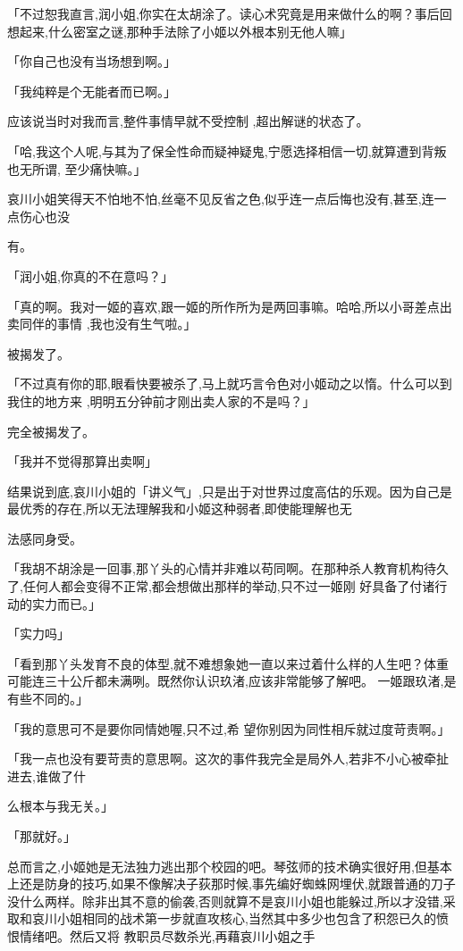 \documentclass{article}
\begin{document}
「不过恕我直言,润小姐,你实在太胡涂了。读心术究竟是用来做什么的啊？事后回想起来,什么密室之谜,那种手法除了小姬以外根本别无他人嘛」


「你自己也没有当场想到啊。」 


「我纯粹是个无能者而已啊。」 

应该说当时对我而言,整件事情早就不受控制
,超出解谜的状态了。 

「哈,我这个人呢,与其为了保全性命而疑神疑鬼,宁愿选择相信一切,就算遭到背叛也无所谓,
至少痛快嘛。」 

哀川小姐笑得天不怕地不怕,丝毫不见反省之色,似乎连一点后悔也没有,甚至,连一点伤心也没
\newpage

有。 


「润小姐,你真的不在意吗？」 

「真的啊。我对一姬的喜欢,跟一姬的所作所为是两回事嘛。哈哈,所以小哥差点出卖同伴的事情
,我也没有生气啦。」 


被揭发了。 

「不过真有你的耶,眼看快要被杀了,马上就巧言令色对小姬动之以惰。什么可以到我住的地方来
,明明五分钟前才刚出卖人家的不是吗？」 


完全被揭发了。 


「我并不觉得那算出卖啊」 

结果说到底,哀川小姐的「讲义气」,只是出于对世界过度高估的乐观。因为自己是最优秀的存在,所以无法理解我和小姬这种弱者,即使能理解也无
\newpage

法感同身受。 

「我胡不胡涂是一回事,那丫头的心情并非难以苟同啊。在那种杀人教育机构待久了,任何人都会变得不正常,都会想做出那样的举动,只不过一姬刚
好具备了付诸行动的实力而已。」 


「实力吗」 

「看到那丫头发育不良的体型,就不难想象她一直以来过着什么样的人生吧？体重可能连三十公斤都未满咧。既然你认识玖渚,应该非常能够了解吧。
一姬跟玖渚,是有些不同的。」 


「我的意思可不是要你同情她喔,只不过,希
望你别因为同性相斥就过度苛责啊。」 

「我一点也没有要苛责的意思啊。这次的事件我完全是局外人,若非不小心被牵扯进去,谁做了什

\newpage
么根本与我无关。」 


「那就好。」 

总而言之,小姬她是无法独力逃出那个校园的吧。琴弦师的技术确实很好用,但基本上还是防身的技巧,如果不像解决子荻那时候,事先编好蜘蛛网埋伏,就跟普通的刀子没什么两样。除非出其不意的偷袭,否则就算不是哀川小姐也能躲过,所以才没错,采取和哀川小姐相同的战术第一步就直攻核心,当然其中多少也包含了积怨已久的愤恨情绪吧。然后又将
教职员尽数杀光,再藉哀川小姐之手 
\end{document}
